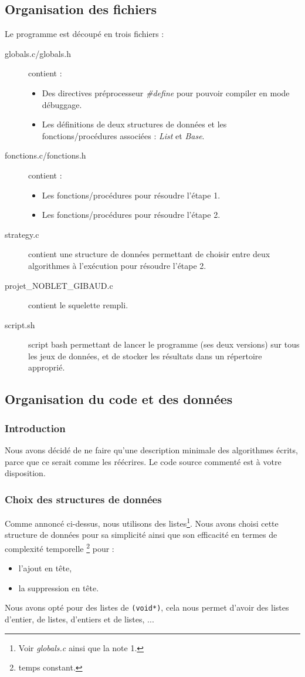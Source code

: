 \documentclass[a4paper,10pt]{article}
\begin{document}
\subsection{Organisation des fichiers}
Le programme est découpé en trois fichiers :
\begin{description}
\item[globals.c/globals.h] contient :
  \begin{itemize}
  \item Des directives préprocesseur \emph{\#define} pour pouvoir compiler en mode débuggage.
  \item Les définitions de deux structures de données et les fonctions/procédures associées : \emph{List} et \emph{Base}.
  \end{itemize}
\item[fonctions.c/fonctions.h] contient :
  \begin{itemize}
  \item Les fonctions/procédures pour résoudre l'étape 1.
  \item Les fonctions/procédures pour résoudre l'étape 2.
  \end{itemize}
\item[strategy.c] contient une structure de données permettant de choisir entre deux algorithmes à l'exécution
  pour résoudre l'étape 2.
\item[projet\_NOBLET\_GIBAUD.c] contient le squelette rempli.
\item[script.sh] script bash permettant de lancer le programme (ses deux versions) sur tous les jeux de données, et
  de stocker les résultats dans un répertoire approprié.
\end{description}
    
\subsection{Organisation du code et des données}

\subsubsection{Introduction}
Nous avons décidé de ne faire qu'une description minimale des algorithmes écrits,
parce que ce serait comme les réécrires.
Le code source commenté est à votre disposition.

\subsubsection{Choix des structures de données}
Comme annoncé ci-dessus, nous utilisons des listes\footnote{Voir \emph{globals.c} ainsi que la note 1.}.
Nous avons choisi cette structure de données pour sa simplicité ainsi que son efficacité en termes de complexité temporelle
\footnote{temps constant.} pour :
\begin{itemize}
\item l'ajout en tête,
\item la suppression en tête.
\end{itemize}
Nous avons opté pour des listes de \verb+(void*)+, cela nous 
permet d'avoir des listes d'entier, de listes, d'entiers et de listes, ...
\end{document}
